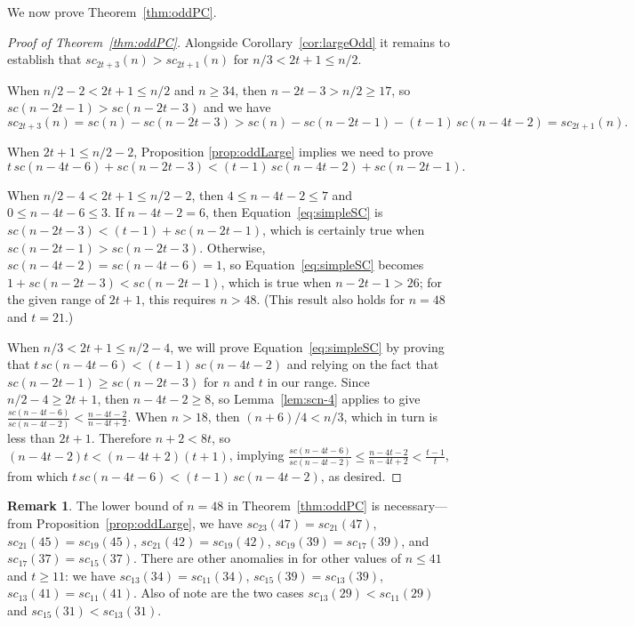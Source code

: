 \documentclass[12pt,leqno]{amsart}
\numberwithin{equation}{section}
\theoremstyle{definition}
\newtheorem*{remark}{Remark}
\begin{document}
We now prove Theorem~\ref{thm:oddPC}.
\begin{proof}[Proof of Theorem~\ref{thm:oddPC}]
Alongside Corollary~\ref{cor:largeOdd} it remains to establish that $sc_{2t+3}(n)>sc_{2t+1}(n)$ for $n/3<2t+1\leq n/2$. 

When $n/2-2<2t+1\leq n/2$ and $n\geq 34$, then $n-2t-3>n/2\geq 17$, so $sc(n-2t-1)>sc(n-2t-3)$ and we have
\[sc_{2t+3}(n)=sc(n)-sc(n-2t-3)>sc(n)-sc(n-2t-1)-(t-1)\,sc(n-4t-2)=sc_{2t+1}(n).\]

When $2t+1\leq n/2-2$, Proposition \ref{prop:oddLarge} implies we need to prove
\begin{equation}
t\,sc(n-4t-6)+sc(n-2t-3)<(t-1)\,sc(n-4t-2)+sc(n-2t-1).
\label{eq:simpleSC}
\end{equation}

When $n/2-4<2t+1\leq n/2-2$, then $4\leq n-4t-2\leq 7$ and $0\leq n-4t-6\leq 3$.  If $n-4t-2=6$, then Equation~\eqref{eq:simpleSC} is $sc(n-2t-3)<(t-1)+sc(n-2t-1)$, which is certainly true when $sc(n-2t-1)>sc(n-2t-3)$.  Otherwise, $sc(n-4t-2)=sc(n-4t-6)=1$, so Equation~\eqref{eq:simpleSC} becomes $1+sc(n-2t-3)<sc(n-2t-1)$, which is true when $n-2t-1>26$; for the given range of $2t+1$, this requires $n>48$.  (This result also holds for $n=48$ and $t=21$.)

When $n/3<2t+1\leq n/2-4$, we will prove Equation~\eqref{eq:simpleSC} by proving that $t\,sc(n-4t-6)<(t-1)\,sc(n-4t-2)$ and relying on the fact that $sc(n-2t-1)\geq sc(n-2t-3)$ for $n$ and $t$ in our range. 
Since $n/2-4\geq 2t+1$, then $n-4t-2\geq 8$, so Lemma~\ref{lem:scn-4} applies to give $\frac{sc(n-4t-6)}{sc(n-4t-2)}< \frac{n-4t-2}{n-4t+2}$.  When $n>18$, then $(n+6)/4<n/3$, which in turn is less than $2t+1$.  Therefore $n+2<8t$, so $(n-4t-2)t<(n-4t+2)(t+1)$, implying $\frac{sc(n-4t-6)}{sc(n-4t-2)}\leq \frac{n-4t-2}{n-4t+2}<\frac{t-1}{t}$, from which $t\,sc(n-4t-6)<(t-1)\,sc(n-4t-2)$, as desired.  
\end{proof}

\begin{remark}
The lower bound of $n=48$ in Theorem~\ref{thm:oddPC} is necessary---from Proposition~\ref{prop:oddLarge}, we have $sc_{23}(47)=sc_{21}(47)$, $sc_{21}(45)=sc_{19}(45)$, $sc_{21}(42)=sc_{19}(42)$, $sc_{19}(39)=sc_{17}(39)$,  and $sc_{17}(37)=sc_{15}(37)$.  There are other anomalies in for other values of $n\leq 41$ and $t\geq 11$: we have $sc_{13}(34)=sc_{11}(34)$, $sc_{15}(39)=sc_{13}(39)$, $sc_{13}(41)=sc_{11}(41)$. Also of note are the two cases $sc_{13}(29)<sc_{11}(29)$ and $sc_{15}(31)<sc_{13}(31)$.
\end{remark}
\end{document}
